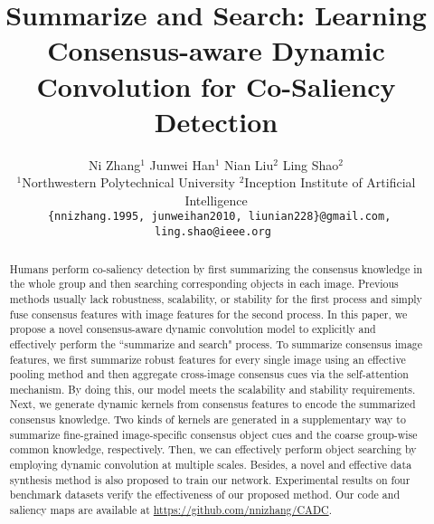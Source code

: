 \documentclass[10pt,twocolumn,letterpaper]{article}
\begin{document}
\title{Summarize and Search: Learning Consensus-aware Dynamic Convolution for Co-Saliency Detection}

\author{
	Ni Zhang$^{1}$
	\hspace{25pt}
	Junwei Han$^{1}$
	\hspace{25pt}
	Nian Liu$^{2}$\footnotemark[1]
	\hspace{25pt}
	Ling Shao$^{2}$
	\hspace{25pt}
	\\
	$^1$Northwestern Polytechnical University
	\hspace{8pt}
	$^2$Inception Institute of Artificial Intelligence
	\\
	{\tt\small
    \{nnizhang.1995, junweihan2010, liunian228\}@gmail.com, ling.shao@ieee.org
    }
}

\maketitle
{} 
\ificcvfinal\thispagestyle{empty}\fi


\begin{abstract}
   Humans perform co-saliency detection by first summarizing the consensus knowledge in the whole group and then searching corresponding objects in each image. Previous methods usually lack robustness, scalability, or stability for the first process and simply fuse consensus features with image features for the second process.
   In this paper, we propose a novel consensus-aware dynamic convolution model to explicitly and effectively perform the ``summarize and search" process. To summarize consensus image features, we first summarize robust features for every single image using an effective pooling method and then aggregate cross-image consensus cues via the self-attention mechanism. By doing this, our model meets the scalability and stability requirements. Next, we generate dynamic kernels from consensus features
   to encode the summarized consensus knowledge. Two kinds of kernels are generated in a supplementary way to summarize fine-grained image-specific consensus object cues and the coarse group-wise common knowledge, respectively. Then, we can effectively perform object searching by employing dynamic convolution at multiple scales.
   Besides, a novel and effective data synthesis method is also proposed to train our network.
   Experimental results on four benchmark datasets verify the effectiveness of our proposed method. Our code and saliency maps are available at \url{https://github.com/nnizhang/CADC}. 
\end{abstract}
\end{document}
